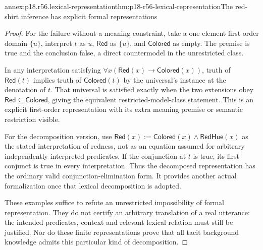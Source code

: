\begin{annexitem}{annex:p18.r56.lexical-representation}{thm:p18-r56-lexical-representation}{The red-shirt inference has explicit formal representations}
\begin{proof}
For the failure without a meaning constraint, take a one-element
first-order domain \(\{u\}\), interpret \(t\) as \(u\),
\(\mathsf{Red}\) as \(\{u\}\), and \(\mathsf{Colored}\)
as empty. The premise is true and the conclusion false, a direct
countermodel in the unrestricted class.

In any interpretation satisfying
\(\forall x(\mathsf{Red}(x)\to\mathsf{Colored}(x))\),
truth of \(\mathsf{Red}(t)\) implies truth of
\(\mathsf{Colored}(t)\) by the universal's instance at the
denotation of \(t\). That universal is satisfied exactly when
the two extensions obey
\(\mathsf{Red}\subseteq\mathsf{Colored}\), giving the equivalent
restricted-model-class statement. This is an explicit first-order
representation with its extra meaning premise or semantic restriction
visible.

For the decomposition version, use
\(\mathsf{Red}(x):=\mathsf{Colored}(x)\land\mathsf{RedHue}(x)\)
as the stated interpretation of redness, not as an equation assumed
for arbitrary independently interpreted predicates. If the conjunction
at \(t\) is true, its first conjunct is true in every interpretation.
Thus the decomposed representation has the ordinary valid
conjunction-elimination form. It provides another actual formalization
once that lexical decomposition is adopted.

These examples suffice to refute an unrestricted impossibility of
formal representation. They do not certify an arbitrary translation
of a real utterance: the intended predicates, context and relevant
lexical relation must still be justified. Nor do these finite
representations prove that all tacit background knowledge admits
this particular kind of decomposition.
\end{proof}
\end{annexitem}

